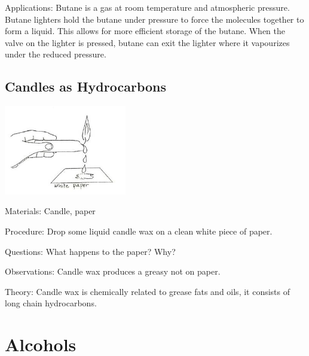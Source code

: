 \begin{multicols}{2}
\begin{description*}
\item[Applications:]{Butane is a gas at room temperature and atmospheric pressure. Butane lighters hold the butane under pressure to force the molecules together to form a liquid. This allows for more efficient storage of the butane. When the valve on the lighter is pressed, butane can exit the lighter where it vapourizes under the reduced pressure.}
\end{description*}

\subsection{Candles as Hydrocarbons}

\begin{center}
\includegraphics[width=0.4\textwidth]{./img/source/candle-hydrocarbon.jpg}
\end{center}

\begin{description*}
\item[Materials:]{Candle, paper}
\item[Procedure:]{Drop some liquid candle wax on a clean
white piece of paper.}
\item[Questions:]{What happens to the paper? Why?}
\item[Observations:]{Candle wax produces a greasy not on paper.}
\item[Theory:]{Candle wax is chemically related to grease
fats and oils, it consists of long chain
hydrocarbons.}
\end{description*}


\section*{Alcohols}



\end{multicols}

